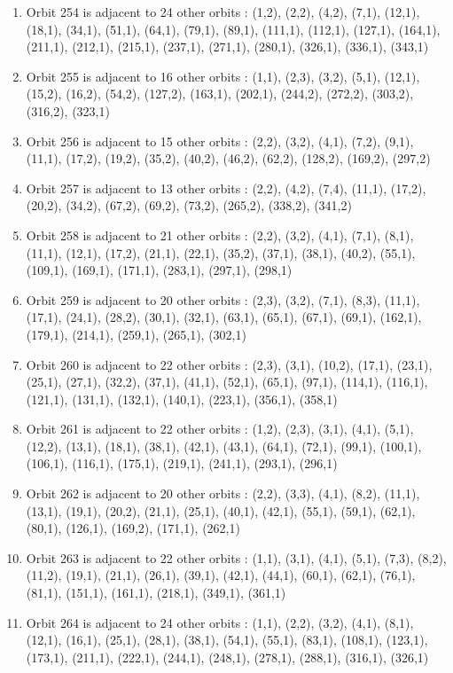 \documentclass[12pt]{article}
\begin{document}
\begin{enumerate}
\item Orbit 254 is adjacent to 24 other orbits : (1,2), (2,2), (4,2), (7,1), (12,1), (18,1), (34,1), (51,1), (64,1), (79,1), (89,1), (111,1), (112,1), (127,1), (164,1), (211,1), (212,1), (215,1), (237,1), (271,1), (280,1), (326,1), (336,1), (343,1)
\item Orbit 255 is adjacent to 16 other orbits : (1,1), (2,3), (3,2), (5,1), (12,1), (15,2), (16,2), (54,2), (127,2), (163,1), (202,1), (244,2), (272,2), (303,2), (316,2), (323,1)
\item Orbit 256 is adjacent to 15 other orbits : (2,2), (3,2), (4,1), (7,2), (9,1), (11,1), (17,2), (19,2), (35,2), (40,2), (46,2), (62,2), (128,2), (169,2), (297,2)
\item Orbit 257 is adjacent to 13 other orbits : (2,2), (4,2), (7,4), (11,1), (17,2), (20,2), (34,2), (67,2), (69,2), (73,2), (265,2), (338,2), (341,2)
\item Orbit 258 is adjacent to 21 other orbits : (2,2), (3,2), (4,1), (7,1), (8,1), (11,1), (12,1), (17,2), (21,1), (22,1), (35,2), (37,1), (38,1), (40,2), (55,1), (109,1), (169,1), (171,1), (283,1), (297,1), (298,1)
\item Orbit 259 is adjacent to 20 other orbits : (2,3), (3,2), (7,1), (8,3), (11,1), (17,1), (24,1), (28,2), (30,1), (32,1), (63,1), (65,1), (67,1), (69,1), (162,1), (179,1), (214,1), (259,1), (265,1), (302,1)
\item Orbit 260 is adjacent to 22 other orbits : (2,3), (3,1), (10,2), (17,1), (23,1), (25,1), (27,1), (32,2), (37,1), (41,1), (52,1), (65,1), (97,1), (114,1), (116,1), (121,1), (131,1), (132,1), (140,1), (223,1), (356,1), (358,1)
\item Orbit 261 is adjacent to 22 other orbits : (1,2), (2,3), (3,1), (4,1), (5,1), (12,2), (13,1), (18,1), (38,1), (42,1), (43,1), (64,1), (72,1), (99,1), (100,1), (106,1), (116,1), (175,1), (219,1), (241,1), (293,1), (296,1)
\item Orbit 262 is adjacent to 20 other orbits : (2,2), (3,3), (4,1), (8,2), (11,1), (13,1), (19,1), (20,2), (21,1), (25,1), (40,1), (42,1), (55,1), (59,1), (62,1), (80,1), (126,1), (169,2), (171,1), (262,1)
\item Orbit 263 is adjacent to 22 other orbits : (1,1), (3,1), (4,1), (5,1), (7,3), (8,2), (11,2), (19,1), (21,1), (26,1), (39,1), (42,1), (44,1), (60,1), (62,1), (76,1), (81,1), (151,1), (161,1), (218,1), (349,1), (361,1)
\item Orbit 264 is adjacent to 24 other orbits : (1,1), (2,2), (3,2), (4,1), (8,1), (12,1), (16,1), (25,1), (28,1), (38,1), (54,1), (55,1), (83,1), (108,1), (123,1), (173,1), (211,1), (222,1), (244,1), (248,1), (278,1), (288,1), (316,1), (326,1)

\end{enumerate}
\end{document}

